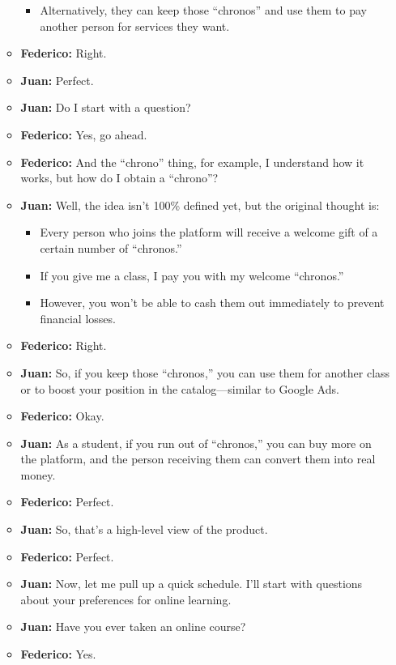 \begin{enumerate}
\begin{itemize}
\begin{itemize}
            \item Alternatively, they can keep those ``chronos'' and use them to pay another person for services they want.
        \end{itemize}
        \item \textbf{Federico:} Right.
        \item \textbf{Juan:} Perfect.
        \item \textbf{Juan:} Do I start with a question?
        \item \textbf{Federico:} Yes, go ahead.
        \item \textbf{Federico:} And the ``chrono'' thing, for example, I understand how it works, but how do I obtain a ``chrono''?
        \item \textbf{Juan:} Well, the idea isn’t 100\% defined yet, but the original thought is:
        \begin{itemize}
            \item Every person who joins the platform will receive a welcome gift of a certain number of ``chronos.''
            \item If you give me a class, I pay you with my welcome ``chronos.''
            \item However, you won’t be able to cash them out immediately to prevent financial losses.
        \end{itemize}
        \item \textbf{Federico:} Right.
        \item \textbf{Juan:} So, if you keep those ``chronos,'' you can use them for another class or to boost your position in the catalog—similar to Google Ads.
        \item \textbf{Federico:} Okay.
        \item \textbf{Juan:} As a student, if you run out of ``chronos,'' you can buy more on the platform, and the person receiving them can convert them into real money.
        \item \textbf{Federico:} Perfect.
        \item \textbf{Juan:} So, that's a high-level view of the product.
        \item \textbf{Federico:} Perfect.
        \item \textbf{Juan:} Now, let me pull up a quick schedule.
        I'll start with questions about your preferences for online learning.
        \item \textbf{Juan:} Have you ever taken an online course?
        \item \textbf{Federico:} Yes.

\end{itemize}
\end{enumerate}
